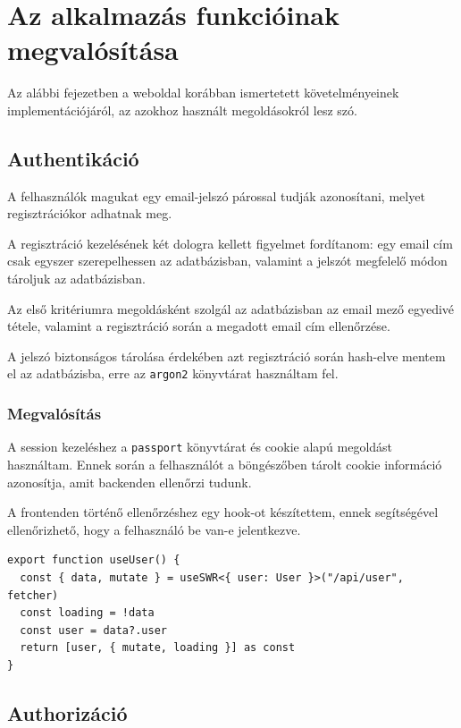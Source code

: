 \chapter{Az alkalmazás funkcióinak megvalósítása}

Az alábbi fejezetben a weboldal korábban ismertetett követelményeinek implementációjáról, az azokhoz használt
megoldásokról lesz szó.

\section{Authentikáció}

A felhasználók magukat egy email-jelszó párossal tudják azonosítani, melyet regisztrációkor adhatnak meg.

A regisztráció kezelésének két dologra kellett figyelmet fordítanom: egy email cím csak egyszer szerepelhessen
az adatbázisban, valamint a jelszót megfelelő módon tároljuk az adatbázisban.

Az első kritériumra megoldásként szolgál az adatbázisban az email mező egyedivé tétele, valamint a regisztráció során
a megadott email cím ellenőrzése.

A jelszó biztonságos tárolása érdekében azt regisztráció során hash-elve mentem el az adatbázisba, erre az \lstinline|argon2| könyvtárat
használtam fel.

\subsection{Megvalósítás}

A session kezeléshez a \lstinline|passport| könyvtárat és cookie alapú megoldást használtam. Ennek során a felhasználót a böngészőben
tárolt cookie információ azonosítja, amit backenden ellenőrzi tudunk.

A frontenden történő ellenőrzéshez egy hook-ot készítettem, ennek segítségével ellenőrizhető, hogy a felhasználó be van-e jelentkezve.

\begin{lstlisting}[caption=Authentikáció hook]
export function useUser() {
  const { data, mutate } = useSWR<{ user: User }>("/api/user", fetcher)
  const loading = !data
  const user = data?.user
  return [user, { mutate, loading }] as const
}
\end{lstlisting}

\section{Authorizáció}

